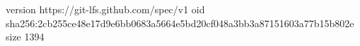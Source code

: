 version https://git-lfs.github.com/spec/v1
oid sha256:2cb255ce48e17d9e6bb0683a5664e5bd20cf048a3bb3a87151603a77b15b802e
size 1394

